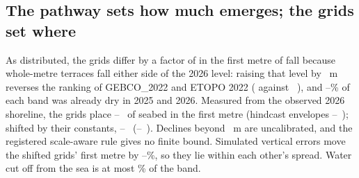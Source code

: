 \subsection{The pathway sets how much emerges; the grids set where}
As distributed, the grids differ by a factor of  in the first metre of fall because whole-metre terraces fall either side of the 2026 level: raising that level by ~m reverses the ranking of GEBCO\_2022 and ETOPO 2022 ( against ~\kmsq{}), and --\% of each band was already dry in 2025 and 2026. Measured from the observed 2026 shoreline, the grids place --~\kmsq{} of seabed in the first metre (hindcast envelopes --~\kmsq{}); shifted by their constants, --~\kmsq{} (--~\kmsq{}). Declines beyond ~m are uncalibrated, and the registered scale-aware rule gives no finite bound. Simulated vertical errors move the shifted grids' first metre by --\%, so they lie within each other's spread. Water cut off from the sea is at most \% of the band.

